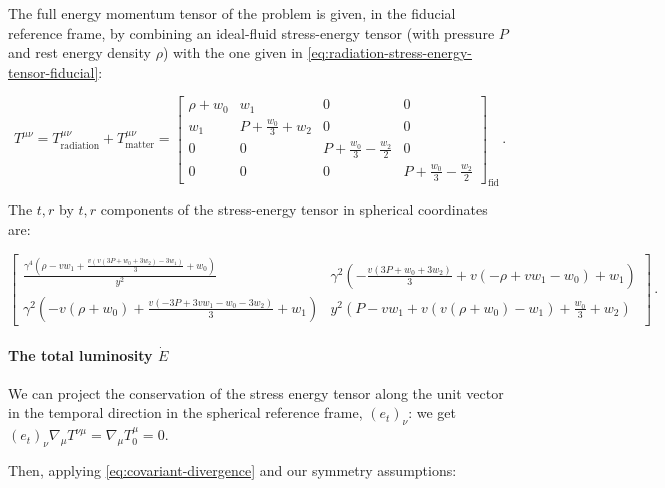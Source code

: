 \documentclass[main.tex]{subfiles}
\begin{document}
The full energy momentum tensor of the problem is given, in the fiducial reference frame, by combining an ideal-fluid stress-energy tensor (with pressure \(P\) and rest energy density \(\rho\)) with the one given in \eqref{eq:radiation-stress-energy-tensor-fiducial}:

\begin{equation}
    T^{\mu\nu} =
    T^{\mu\nu}_{\text{radiation}} +
    T^{\mu\nu}_{\text{matter}} =
    \left[\begin{matrix}\rho + w_{0} & w_{1} & 0 & 0\\w_{1} & P + \frac{w_{0}}{3} + w_{2} & 0 & 0\\0 & 0 & P + \frac{w_{0}}{3} - \frac{w_{2}}{2} & 0\\0 & 0 & 0 & P + \frac{w_{0}}{3} - \frac{w_{2}}{2}\end{matrix}\right] _{\text{fid}}\,.
\end{equation}

The \(t,r\) by \(t, r\) components of the stress-energy tensor in spherical coordinates are:

\begin{equation} \label{eq:spherical-coordinates-full-stress-energy-tensor}
      \left[
      \begin{matrix}
      \frac{\gamma^{4} \left(\rho - v w_{1} + \frac{v \left(v \left(3 P + w_{0} + 3 w_{2}\right) - 3 w_{1}\right)}{3} + w_{0}\right)}{y^{2}} &
      \gamma^{2} \left(- \frac{v \left(3 P + w_{0} + 3 w_{2}\right)}{3} + v \left(- \rho + v w_{1} - w_{0}\right) + w_{1}\right)\\
      \gamma^{2} \left(- v \left(\rho + w_{0}\right) + \frac{v \left(- 3 P + 3 v w_{1} - w_{0} - 3 w_{2}\right)}{3} + w_{1}\right) &
      y^{2} \left(P - v w_{1} + v \left(v \left(\rho + w_{0}\right) - w_{1}\right) + \frac{w_{0}}{3} + w_{2}\right)
    \end{matrix}
      \right] \,.
\end{equation}

\paragraph{The total luminosity \(\dot{E}\)}

We can project the conservation of the stress energy tensor along the unit vector in the temporal direction in the spherical reference frame, \((e_t)_\nu\): we get  \((e_t)_\nu \nabla_\mu T^{\nu\mu} = \nabla_\mu T_0^\mu = 0\).

Then, applying \eqref{eq:covariant-divergence} and our symmetry assumptions:
\end{document}
